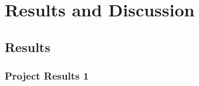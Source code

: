 \chapter{Results and Discussion}

\section{Results}\label{sec:Results}

\subsection{Project Results 1}\label{sec:project results}


